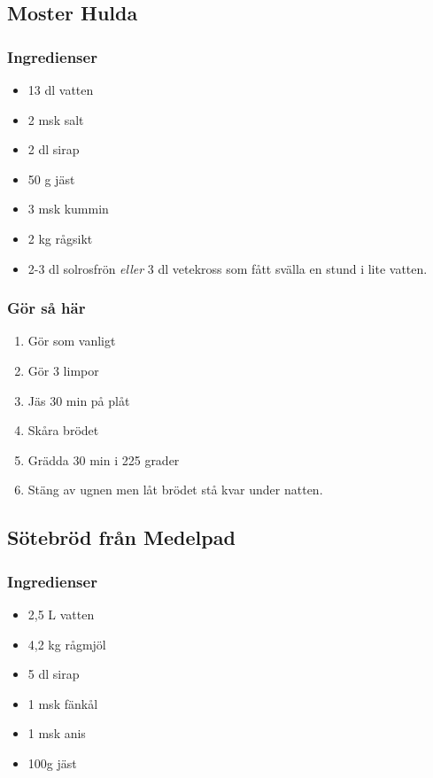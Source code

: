 \documentclass[a4paper,11pt,twocolumn]{article}
\begin{document}
\subsection{Moster Hulda}
\subsubsection*{Ingredienser}
\begin{itemize}[noitemsep]
    \item 13 dl vatten
    \item 2 msk salt
    \item 2 dl sirap
    \item 50 g jäst
    \item 3 msk kummin
    \item 2 kg rågsikt
    \item 2-3 dl solrosfrön \emph{eller} 3 dl vetekross som fått svälla en stund i lite vatten.
\end{itemize}
\subsubsection*{Gör så här}
\begin{enumerate}[label=\arabic*.]
    \item Gör som vanligt
    \item Gör 3 limpor
    \item Jäs 30 min på plåt
    \item Skåra brödet
    \item Grädda 30 min i 225 grader
    \item Stäng av ugnen men låt brödet stå kvar under natten.
\end{enumerate}



\subsection{Sötebröd från Medelpad}
\subsubsection*{Ingredienser}
\begin{itemize}[noitemsep]
    \item 2,5 L vatten
    \item 4,2 kg rågmjöl
    \item 5 dl sirap
    \item 1 msk fänkål
    \item 1 msk anis
    \item 100g jäst
\end{itemize}
\end{document}
